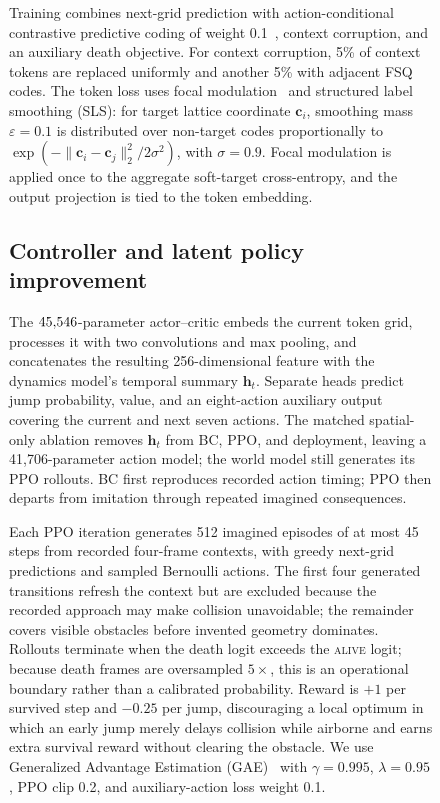 \begin{figure}[!htbp]
Training combines next-grid prediction with action-conditional contrastive predictive coding of weight 0.1~\citep{burchi2025twister,oord2018cpc}, context corruption, and an auxiliary death objective.
For context corruption, 5\% of context tokens are replaced uniformly and another 5\% with adjacent FSQ codes.
The token loss uses focal modulation~\citep{lin2017focal} and structured label smoothing (SLS): for target lattice coordinate \(\mathbf c_i\), smoothing mass \(\varepsilon=0.1\) is distributed over non-target codes proportionally to \(\exp(-\|\mathbf c_i-\mathbf c_j\|_2^2/2\sigma^2)\), with \(\sigma=0.9\).
Focal modulation is applied once to the aggregate soft-target cross-entropy, and the output projection is tied to the token embedding.

\subsection{Controller and latent policy improvement}
\label{sec:controller}

The \(45{,}546\)-parameter actor--critic embeds the current token grid, processes it with two convolutions and max pooling, and concatenates the resulting 256-dimensional feature with the dynamics model's temporal summary \(\mathbf h_t\).
Separate heads predict jump probability, value, and an eight-action auxiliary output covering the current and next seven actions.
The matched spatial-only ablation removes \(\mathbf h_t\) from BC, PPO, and deployment, leaving a 41,706-parameter action model; the world model still generates its PPO rollouts.
BC first reproduces recorded action timing; PPO then departs from imitation through repeated imagined consequences.

Each PPO iteration generates 512 imagined episodes of at most 45 steps from recorded four-frame contexts, with greedy next-grid predictions and sampled Bernoulli actions.
The first four generated transitions refresh the context but are excluded because the recorded approach may make collision unavoidable; the remainder covers visible obstacles before invented geometry dominates.
Rollouts terminate when the death logit exceeds the \textsc{alive} logit; because death frames are oversampled \(5\times\), this is an operational boundary rather than a calibrated probability.
Reward is \(+1\) per survived step and \(-0.25\) per jump, discouraging a local optimum in which an early jump merely delays collision while airborne and earns extra survival reward without clearing the obstacle.
We use Generalized Advantage Estimation (GAE)~\citep{schulman2015gae} with \(\gamma=0.995\), \(\lambda=0.95\), PPO clip 0.2, and auxiliary-action loss weight 0.1.


\end{figure}
